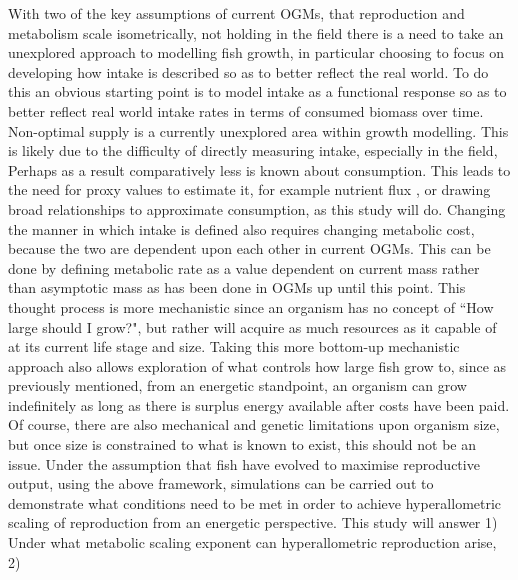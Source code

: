 \documentclass[a4paper, 11pt, hidelinks]{article} %
\begin{document}
	
	With two of the key assumptions of current OGMs, that reproduction and metabolism scale isometrically, not holding in the field \parencite{Barneche2018, Pawar2012, Peters1983} there is a need to take an unexplored approach to modelling fish growth, in particular choosing to focus on developing how intake is described so as to better reflect the real world.  To do this an obvious starting point is to model intake as a functional response \parencite{Holling1959} so as to better reflect real world intake rates in terms of consumed biomass over time.  Non-optimal supply is a currently unexplored area within growth modelling.  This is likely due to the difficulty of directly measuring intake, especially in the field, Perhaps as a result comparatively less is known about consumption.  This leads to the need for proxy values to estimate it, for example nutrient flux \parencite{Schiettekatte2020}, or drawing broad relationships to approximate consumption, as this study will do.
	Changing the manner in which intake is defined also requires changing metabolic cost, because the two are dependent upon each other in current OGMs.  This can be done by defining metabolic rate as a value dependent on current mass rather than asymptotic mass as has been done in OGMs up until this point.  This thought process is more mechanistic since an organism has no concept of ``How large should I grow?", but rather will acquire as much resources as it capable of at its current life stage and size.  Taking this more bottom-up mechanistic approach also allows exploration of what controls how large fish grow to, since as previously mentioned, from an energetic standpoint, an organism can grow indefinitely as long as there is surplus energy available after costs have been paid.  Of course, there are also mechanical and genetic limitations upon organism size, but once size is constrained to what is known to exist, this should not be an issue.  
	Under the assumption that fish have evolved to maximise reproductive output, using the above framework, simulations can be carried out to demonstrate what conditions need to be met in order to achieve hyperallometric scaling of reproduction from an energetic perspective.  This study will answer 1) Under what metabolic scaling exponent can hyperallometric reproduction arise, 2) 
	
\end{document}
